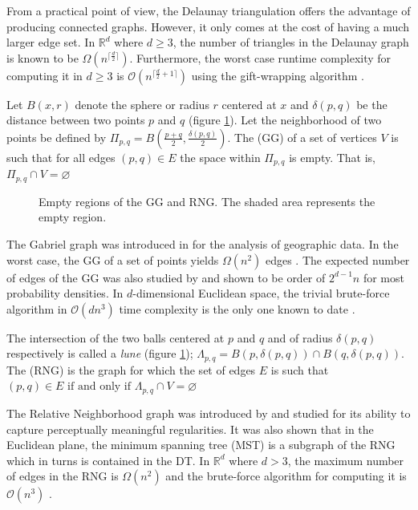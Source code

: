 From a practical point of view, the Delaunay triangulation offers the advantage of
producing connected graphs. However, it only comes at the cost of having a much larger edge set. In $\mathbb{R}^d$ where $d \geq 3$, the number of triangles in the Delaunay graph is known to be $\Omega(n^{\lceil\frac{d}{2} \rceil})$. Furthermore, the worst case runtime complexity for computing it in $d \geq 3$ is $\mathcal{O}(n^{\lceil\frac{d}{2} +1 \rceil})$ using the gift-wrapping algorithm \parencite{Fortune1997}.

\begin{defn}
Let $B(x, r)$ denote the sphere or radius $r$ centered at $x$ and $\delta(p,q)$ be the distance between two points $p$ and $q$ (figure \ref{fig:erg-construct}). Let the neighborhood of two points be defined by $\Pi_{p,q} = B(\frac{p+q}{2}, \frac{\delta(p, q)}{2})$. The  (GG) of a set of vertices $V$ is such that for all edges $(p, q) \in E$  the space within $\Pi_{p,q}$ is empty. That is, $\Pi_{p,q} \cap V = \varnothing$
\end{defn}

\begin{figure}[ht]
\centering
\subbottom[GG]{%
}
\subbottom[RNG]{
}
\caption{Empty regions of the GG and RNG. The shaded area represents the empty region.}
\label{fig:erg-construct}
\end{figure}

The Gabriel graph was introduced in \cite{Gabriel1969} for the analysis of geographic data. In the worst case, the GG of a set of points yields $\Omega(n^2)$ edges \parencite{Toussaint1992}. The expected number of edges of the GG was also studied by \cite{Devroye1988} and shown to be order of $2^{d-1}n$ for most probability densities. In $d$-dimensional Euclidean space, the trivial brute-force algorithm in $\mathcal{O}(dn^3)$ time complexity is the only one known to date \parencite{Toussaint2012}.

\begin{defn}
The intersection of the two balls centered at $p$ and $q$ and of radius $\delta(p,q)$ respectively is called a \textit{lune} (figure \ref{fig:erg-construct}); $\Lambda_{p,q} = B(p, \delta(p,q)) \cap B(q, \delta(p,q))$. The  (RNG) is the graph for which the set of edges $E$ is such that $(p,q) \in E 	\text{ if and only if } \Lambda_{p,q} \cap V = \varnothing$ 
\end{defn}

The Relative Neighborhood graph was introduced by \cite{Toussaint1980} and studied for its ability to capture perceptually meaningful regularities. It was also shown that in the Euclidean plane, the minimum spanning tree (MST) is a subgraph of the RNG which in turns is contained in the DT. In $\mathbb{R}^d$ where $d > 3$, the maximum number of edges in the RNG is $\Omega(n^2)$ \parencite{Toussaint1992} and the brute-force algorithm for computing it is $\mathcal{O}(n^3)$ \parencite{Toussaint1980}.

